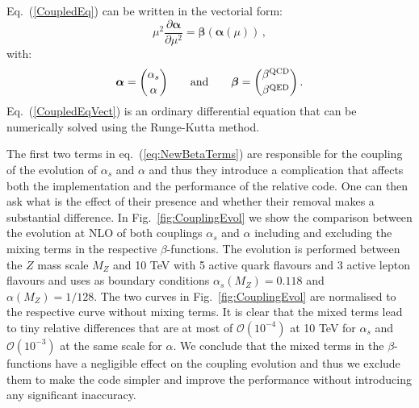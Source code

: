 Eq.~(\ref{CoupledEq}) can be written in the vectorial form:
\begin{equation}\label{CoupledEqVect}
\mu^2\frac{\partial {\bm \alpha}}{\partial \mu^2} = {\bm \beta}\left({\bm \alpha}(\mu)\right)\,,
\end{equation}
with:
\begin{equation}
  {\bm \alpha} = {\alpha_s \choose \alpha}\qquad\mbox{and}\qquad  {\bm \beta} = {\beta^{\rm QCD} \choose \beta^{\rm QED}}\,.
\end{equation}
Eq.~(\ref{CoupledEqVect}) is an ordinary differential equation that
can be numerically solved using the Runge-Kutta method.

The first two terms in eq.~(\ref{eq:NewBetaTerms}) are responsible for
the coupling of the evolution of $\alpha_s$ and $\alpha$ and thus they
introduce a complication that affects both the implementation and the
performance of the relative code. One can then ask what is the effect
of their presence and whether their removal makes a substantial
difference. In Fig.~\ref{fig:CouplingEvol} we show the comparison
between the evolution at NLO of both couplings $\alpha_s$ and $\alpha$
including and excluding the mixing terms in the respective
$\beta$-functions. The evolution is performed between the $Z$ mass
scale $M_Z$ and 10 TeV with 5 active quark flavours and 3 active
lepton flavours and uses as boundary conditions
$\alpha_s(M_Z) = 0.118$ and $\alpha(M_Z) = 1/128$. The two curves in
Fig.~\ref{fig:CouplingEvol} are normalised to the respective curve
without mixing terms. It is clear that the mixed terms lead to tiny
relative differences that are at most of $\mathcal{O}(10^{-4})$ at 10
TeV for $\alpha_s$ and $\mathcal{O}(10^{-3})$ at the same scale for
$\alpha$. We conclude that the mixed terms in the $\beta$-functions
have a negligible effect on the coupling evolution and thus we exclude
them to make the code simpler and improve the performance without
introducing any significant inaccuracy.

